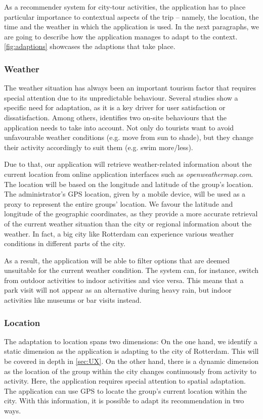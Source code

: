 \documentclass[11pt,a4paper,oneside]{article}
\begin{document}
As a recommender system for city-tour activities, the application has to place particular importance to contextual aspects of the trip -- namely, the location, the time and the weather in which the application is used. In the next paragraphs, we are going to describe how the application manages to adapt to the context. \autoref{fig:adaptions} showcases the adaptions that take place.

\subsubsection{Weather}
The weather situation has always been an important tourism factor that requires special attention due to its unpredictable behaviour. Several studies show a specific need for adaptation, as it is a key driver for user satisfaction or dissatisfaction.\cite{becken_ImportanceClimateWeather_2010} Among others, \citeauthor{defreitas_TourismClimatologyEvaluating_2003} identifies two on-site behaviours that the application needs to take into account. Not only do tourists want to avoid unfavourable weather conditions (e.g. move from sun to shade), but they change their activity accordingly to suit them (e.g. swim more/less). 

Due to that, our application will retrieve weather-related information about the current location from online application interfaces such as \emph{openweathermap.com}. The location will be based on the longitude and latitude of the group's location. The administrator's GPS location, given by a mobile device, will be used as a proxy to represent the entire groups' location. We favour the latitude and longitude of the geographic coordinates, as they provide a more accurate retrieval of the current weather situation than the city or regional information about the weather. In fact, a big city like Rotterdam can experience various weather conditions in different parts of the city. 

As a result, the application will be able to filter options that are deemed unsuitable for the current weather condition. The system can, for instance, switch from outdoor activities to indoor activities and vice versa.\cite{creemers2015meteorological} This means that a park visit will not appear as an alternative during heavy rain, but indoor activities like museums or bar visits instead.

\subsubsection{Location}
The adaptation to location spans two dimensions: On the one hand, we identify a static dimension as the application is adapting to the city of Rotterdam. This will be covered in depth in \autoref{sec:UX}. On the other hand, there is a dynamic dimension as the location of the group within the city changes continuously from activity to activity. Here, the application requires special attention to spatial adaptation. The application can use GPS to locate the group's current location within the city. With this information, it is possible to adapt its recommendation in two ways. 
\end{document}
